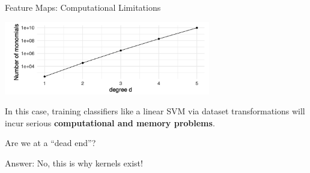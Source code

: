 \begin{vbframe}{Feature Maps: Computational Limitations}
\begin{center}
\includegraphics[width = 9cm ]{figure_man/computational_limits2.png}
\end{center}

In this case, training classifiers like a linear SVM via dataset transformations will incur serious \textbf{computational and memory problems}.

\vspace*{0.2cm} 

Are we at a \enquote{dead end}?

Answer: No, this is why kernels exist!

\end{vbframe}

\endlecture

